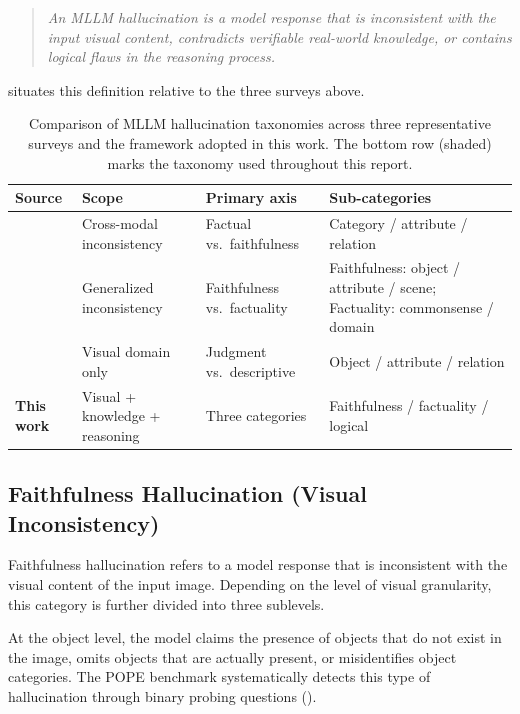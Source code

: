 \begin{quote}
\textit{An MLLM hallucination is a model response
that is inconsistent with the input visual content,
contradicts verifiable real-world knowledge,
or contains logical flaws in the reasoning process.}
\end{quote}

 situates this definition
relative to the three surveys above.

\begin{table}[htbp]
  \centering
  \caption{Comparison of MLLM hallucination taxonomies
    across three representative surveys and the framework adopted in this work.
    The bottom row (shaded) marks the taxonomy used throughout this report.}
  \label{tab:taxonomy_comparison}
  \small
  \begin{tabular}{lp{2.6cm}p{3.2cm}p{5.1cm}}
    \toprule
    Source & Scope & Primary axis & Sub-categories \\
    \midrule
    \citet{baiHallucinationMultimodalLarge2025}
      & Cross-modal inconsistency
      & Factual vs.\ faithfulness
      & Category / attribute / relation \\
    \citet{chenSurveyMultimodalHallucination2026}
      & Generalized inconsistency
      & Faithfulness vs.\ factuality
      & Faithfulness: object / attribute / scene; Factuality: commonsense / domain \\
    \citet{liuSurveyHallucinationLarge2024}
      & Visual domain only
      & Judgment vs.\ descriptive
      & Object / attribute / relation \\
    \midrule
    \rowcolor{pink!20}
    \textbf{This work}
      & Visual + knowledge + reasoning
      & Three categories
      & Faithfulness / factuality / logical \\
    \bottomrule
  \end{tabular}
\end{table}

\subsection{Faithfulness Hallucination (Visual Inconsistency)}

Faithfulness hallucination refers to a model response
that is inconsistent with the visual content of the input image.
Depending on the level of visual granularity,
this category is further divided into three sublevels.

At the object level,
the model claims the presence of objects that do not exist in the image,
omits objects that are actually present,
or misidentifies object categories.
The POPE benchmark systematically detects this type of hallucination
through binary probing questions
().

